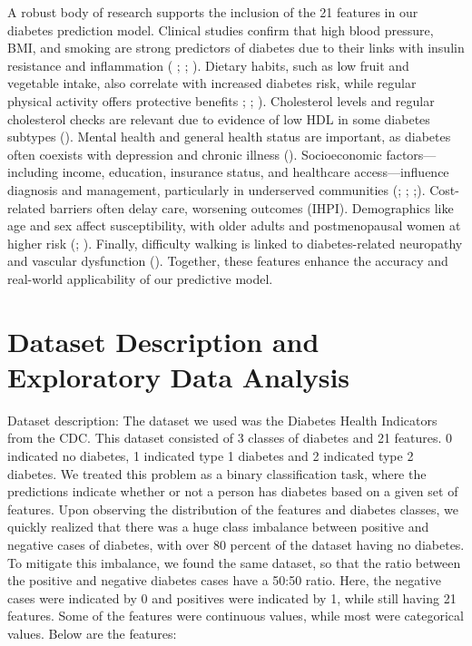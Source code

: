 \documentclass[conference]{IEEEtran}
\begin{document}
A robust body of research supports the inclusion of the 21 features in our diabetes prediction model. Clinical studies confirm that high blood pressure, BMI, and smoking are strong predictors of diabetes due to their links with insulin resistance and inflammation ( \cite{lambert2021hypertension}; \cite{yashi2023obesity}; \cite{li2014fruitveg}). Dietary habits, such as low fruit and vegetable intake, also correlate with increased diabetes risk, while regular physical activity offers protective benefits \cite{sun2013fruit}; \cite{song2008fruit}; \cite{williams2008exercise}). Cholesterol levels and regular cholesterol checks are relevant due to evidence of low HDL in some diabetes subtypes (\cite{kennedy1978hdl}). Mental health and general health status are important, as diabetes often coexists with depression and chronic illness (\cite{gornik2010hyperglycaemia}). Socioeconomic factors—including income, education, insurance status, and healthcare access—influence diagnosis and management, particularly in underserved communities (\cite{zhu2012insurance}; \cite{patzer2021access}; \cite{lysy2013income};\cite{choi2024education}). Cost-related barriers often delay care, worsening outcomes (IHPI). Demographics like age and sex affect susceptibility, with older adults and postmenopausal women at higher risk (\cite{moore2003age}; \cite{gale2001rise}). Finally, difficulty walking is linked to diabetes-related neuropathy and vascular dysfunction (\cite{brach2008gait}). Together, these features enhance the accuracy and real-world applicability of our predictive model.

\section{Dataset Description and Exploratory Data Analysis}
Dataset description:
The dataset we used was the Diabetes Health Indicators from the CDC.  This dataset consisted of 3 classes of diabetes and 21 features.  0 indicated no diabetes, 1 indicated type 1 diabetes and 2 indicated type 2 diabetes.  We treated this problem as a binary classification task, where the predictions indicate whether or not a person has diabetes based on a given set of features.  Upon observing the distribution of the features and diabetes classes, we quickly realized that there was a huge class imbalance between positive and negative cases of diabetes, with over 80 percent of the dataset having no diabetes. \\ 
To mitigate this imbalance, we found the same dataset, so that the ratio between the positive and negative diabetes cases have a 50:50 ratio. Here, the negative cases were indicated by 0 and positives were indicated by 1, while still having 21 features.  Some of the features were continuous values, while most were categorical values.  Below are the features:\\
\end{document}
